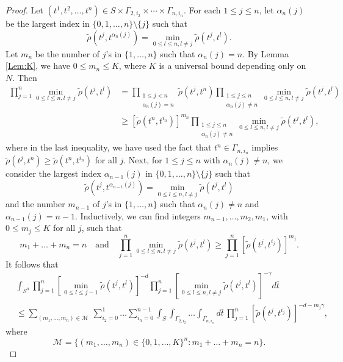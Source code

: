 \documentclass[11pt, reqno]{amsart}
\numberwithin{equation}{section}
\begin{document}
\begin{proof}
Let $(t^1, t^2, \dots, t^n) \in S \times \Gamma_{2, i_2} \times \cdots \times \Gamma_{n,i_n}$.
For each $1 \le j \le n$, let $\alpha_n(j)$ be the largest index in $\{0, 1, \dots, n\} \setminus \{j\}$ such that
\[ \tilde\rho(t^j, t^{\alpha_n(j)}) = \min_{0 \le l \le n, l \ne j} \tilde\rho(t^j, t^l). \]
Let $m_n$ be the number of $j$'s in $\{1, \dots, n\}$ such that $\alpha_n(j) = n$.
By Lemma \ref{Lem:K}, we have $0 \le m_n \le K$, where $K$ is a universal bound depending only on $N$.
Then
\begin{align*}
\prod_{j=1}^{n} \min_{0 \le l \le n, l \ne j} \tilde\rho(t^j, t^l) 
&= \prod_{\substack{1\le j < n\\ \alpha_n(j) = n}}\tilde\rho(t^j, t^n) \prod_{\substack{1\le j \le n\\ \alpha_n(j) \ne n}}
 \min_{0 \le l \le n, l \ne j}\tilde\rho(t^j, t^l)\\
& \ge \left[\tilde\rho(t^n, t^{i_n})\right]^{m_n} \prod_{\substack{1\le j \le n\\ \alpha_n(j) \ne n}}\min_{0 \le l \le n, l \ne j}\tilde\rho(t^j, t^l),
\end{align*}
where in the last inequality, we have used the fact that $t^n \in \Gamma_{n, i_n}$ implies $ \tilde\rho(t^j, t^n)\ge \tilde\rho(t^n, t^{i_n})$ 
for all $j$.
Next, for $1 \le j \le n$ with $\alpha_n(j) \ne n$, we consider the largest index $\alpha_{n-1}(j)$ in $\{0, 1, \dots, n\} \setminus\{j\}$ 
such that
\[ 
\tilde\rho(t^j, t^{\alpha_{n-1}(j)}) = \min_{0 \le l \le n, l \ne j} \tilde\rho(t^j, t^l) 
\]
and the number $m_{n-1}$ of $j$'s in $\{1, \dots, n\}$ such that $\alpha_n(j) \ne n$ and $\alpha_{n-1}(j) = n-1$.
Inductively, we can find integers $m_{n-1}, \dots, m_2, m_1$, with $0 \le m_j \le K$ for all $j$, such that
\[m_1 + \dots + m_n = n \quad \text{and} \quad
\prod_{j=1}^{n} \min_{0 \le l \le n, l \ne j} \tilde\rho(t^j, t^l) \ge \prod_{j=1}^n \left[\tilde\rho(t^j, t^{i_j})\right]^{m_j}. \]
It follows that
\begin{align*}
&\int_{S^n} \prod_{j=1}^n \left[ \min_{0 \le l \le j-1} \tilde\rho(t^j, t^l)\right]^{-d} \prod_{j=1}^n 
\left[ \min_{0 \le l \le n, l \ne j} \tilde\rho(t^j, t^l)\right]^{-\gamma}  d\bar{t}\\
& \le \sum_{(m_1, \dots, m_n) \in {\mathcal M}} \,
\sum_{i_2=0}^1 \dots \sum_{i_n=0}^{n-1}\int_{S}  \int_{\Gamma_{2, i_2}} \dots\int_{\Gamma_{n, i_n}} d\bar{t} \, 
\prod_{j=1}^{n} \left[\tilde\rho(t^j, t^{i_j})\right]^{-d-m_j \gamma},
\end{align*}
where 
\[
{\mathcal M} = \big\{ (m_1, \dots, m_n) \in \{0, 1, \dots, K\}^n : m_1 + \dots + m_n = n \big\}.
\]
\end{proof}
\end{document}
